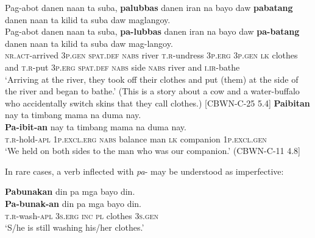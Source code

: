 \ea
\label{bkm:Ref395019310}
Pag-abot  danen  naan  ta  suba,  \textbf{palubbas}  danen  iran  na bayo  daw  \textbf{pabatang}  danen  naan  ta  kilid  ta  suba  daw  maglangoy.\footnotemark{} \\\smallskip
 \gll Pag-abot  danen  naan  ta  suba,  \textbf{pa-lubbas}  danen  iran  na bayo  daw  \textbf{pa-batang}  danen  naan  ta  kilid  ta  suba  daw  mag-langoy.\footnotemark{} \\
\textsc{nr.act}-arrived  3\textsc{p.gen}  \textsc{spat.def}  \textsc{nabs}  river  \textsc{t.r}-undress  3\textsc{p.erg}  3\textsc{p.gen}  \textsc{lk}
clothes  and  \textsc{t.r}-put  3\textsc{p.erg}  \textsc{spat.def}  \textsc{nabs}  side  \textsc{nabs} river  and  \textsc{i.ir}-bathe {} \\
\glt `Arriving at the river, they took off their clothes and put (them) at the side of the river and began to bathe.’ (This is a story about a cow and a water-buffalo who accidentally switch skins that they call clothes.) [CBWN-C-25 5.4]
\z
\ea
\textbf{Paibitan}  nay  ta  timbang  mama  na  duma nay. \\\smallskip
 \gll \textbf{Pa-ibit-an}  nay  ta  timbang  mama  na  duma\footnotemark{}  nay. \\
\textsc{t.r}-hold-\textsc{apl}  1\textsc{p.excl.erg}  \textsc{nabs}  balance  man  \textsc{lk}  companion  1\textsc{p.excl.gen} \\
\glt ‘We held on both sides to the man who was our companion.’ (CBWN-C-11 4.8]
\z

In rare cases, a verb inflected with \textit{pa}{}- may be understood as imperfective:

\ea
\textbf{Pabunakan}  din  pa  mga  bayo  din. \\\smallskip
 \gll \textbf{Pa-bunak-an}  din  pa  mga  bayo  din. \\
\textsc{t.r}-wash-\textsc{apl}  3\textsc{s.erg}  \textsc{inc}  \textsc{pl}  clothes  3\textsc{s.gen} \\
\glt ‘S/he is still washing his/her clothes.’
\z

